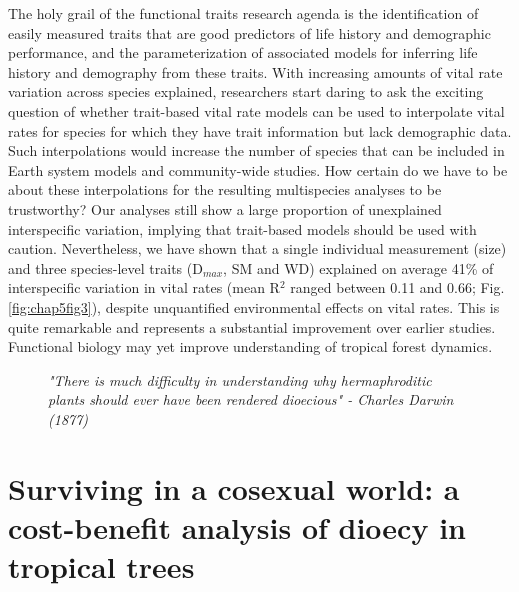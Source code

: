 \documentclass[b5paper,justified]{tufte-book} %
\begin{document}
\begin{fullwidth}
The holy grail of the functional traits research agenda is the identification of easily measured traits that are good
predictors of life history and demographic performance, and the parameterization of associated models for inferring
life history and demography from these traits. With increasing amounts of vital rate variation across species explained, researchers start daring to ask the exciting question of whether trait-based vital rate models can be used to interpolate vital rates for species for which they have trait information but lack demographic data. Such interpolations would increase the number of species that can be included in Earth system models and community-wide studies. How certain do we have to be about these interpolations for the resulting multispecies analyses to be trustworthy? Our analyses still show a large proportion of unexplained interspecific variation, implying that trait-based models should be used with caution. Nevertheless, we have shown that a single individual measurement (size) and three species-level traits (D$_{max}$, SM and WD) explained on average 41\% of interspecific variation in vital rates (mean R$^2$ ranged between 0.11 and 0.66; Fig. \ref{fig:chap5fig3}), despite unquantified environmental effects on vital rates. This is quite remarkable and represents a substantial improvement over earlier studies. Functional biology may yet improve understanding of tropical forest dynamics.

\end{fullwidth}

\vspace*{20cm}

\begin{landscape}
\begin{figure}
\vspace*{-.6cm}\hspace*{4.4cm}
\hspace*{5cm}\begin{minipage}{18cm}
 \textit{ \footnotesize "There is much difficulty in understanding why hermaphroditic plants should ever have been rendered dioecious" - Charles Darwin (1877)}
\end{minipage}
\end{figure}
\end{landscape}
	
\chapter{Surviving in a cosexual world: a cost-benefit analysis of dioecy in tropical trees}
\label{ch6} 
\end{document}
